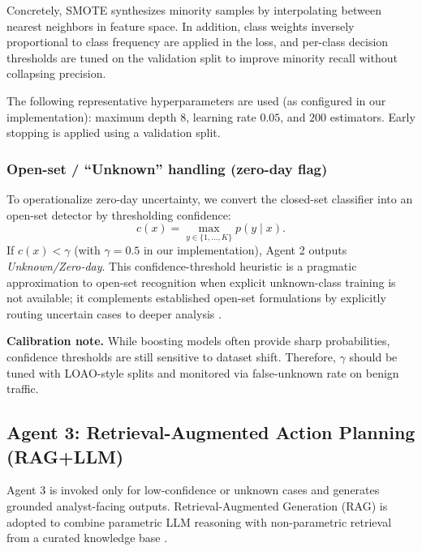 \documentclass[conference]{IEEEtran}
\begin{document}
Concretely, SMOTE synthesizes minority samples by interpolating between nearest neighbors in feature space. In addition, class weights inversely proportional to class frequency are applied in the loss, and per-class decision thresholds are tuned on the validation split to improve minority recall without collapsing precision.

The following representative hyperparameters are used (as configured in our implementation): maximum depth $8$, learning rate $0.05$, and $200$ estimators. Early stopping is applied using a validation split.

\subsubsection{Open-set / ``Unknown'' handling (zero-day flag)}
To operationalize zero-day uncertainty, we convert the closed-set classifier into an open-set detector by thresholding confidence:
\begin{equation}
 c(x) = \max_{y\in\{1,\dots,K\}} p(y\mid x).
\end{equation}
If $c(x) < \gamma$ (with $\gamma=0.5$ in our implementation), Agent 2 outputs \emph{Unknown/Zero-day}. This confidence-threshold heuristic is a pragmatic approximation to open-set recognition when explicit unknown-class training is not available; it complements established open-set formulations by explicitly routing uncertain cases to deeper analysis \cite{Scheirer2013OpenSet,Bendale2016OpenMax}.

\textbf{Calibration note.} While boosting models often provide sharp probabilities, confidence thresholds are still sensitive to dataset shift. Therefore, $\gamma$ should be tuned with LOAO-style splits and monitored via false-unknown rate on benign traffic.

\subsection{Agent 3: Retrieval-Augmented Action Planning (RAG+LLM)}

\label{sec:agent3_method}

Agent 3 is invoked only for low-confidence or unknown cases and generates grounded analyst-facing outputs. Retrieval-Augmented Generation (RAG) is adopted to combine parametric LLM reasoning with non-parametric retrieval from a curated knowledge base \cite{Lewis2020RAG}.
\end{document}
